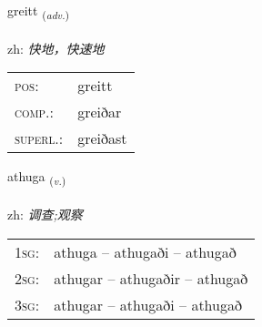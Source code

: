 \documentclass[frontgrid, backgrid]{flacards}\usepackage[]{graphicx}\usepackage[]{color}
\begin{document}
\renewcommand{\flhead}{\vskip5pt \fboxsep=0pt {\small\bfseries\footnotesize Atviksorð | 副词}}
\renewcommand{\fcfoot}{\vskip5pt \fboxsep=0pt \hspace{2pt}{\small\bfseries\footnotesize 2K}}

\renewcommand{\blhead}{\vskip5pt {\small\bfseries\footnotesize Atviksorð | 副词 }}
\renewcommand{\bcfoot}{\vskip5pt \hspace{2pt}{\small\bfseries\footnotesize 2K}}


{greitt \small{\textsubscript{(\textit{adv.})}} \\[1ex] %
\textphonetic{[kreiht]} \\
zh: \emph{快地，快速地} \\  [2ex]
\renewcommand*{\arraystretch}{0.8}
\begin{tabular}{ll}
\textsc{pos}: & greitt \\ 
\textsc{comp.}: & greiðar \\ 
\textsc{superl.}: & greiðast \\
\end{tabular}
}

\renewcommand{\flhead}{\vskip5pt \fboxsep=0pt {\small\bfseries\footnotesize Sagnorð | 动词}}
\renewcommand{\fcfoot}{\vskip5pt \fboxsep=0pt \hspace{2pt}{\small\bfseries\footnotesize 2K}}

\renewcommand{\blhead}{\vskip5pt {\small\bfseries\footnotesize Sagnorð | 动词 }}
\renewcommand{\bcfoot}{\vskip5pt \hspace{2pt}{\small\bfseries\footnotesize 2K}}


{athuga \small{\textsubscript{(\textit{v.})}} \\[1ex] %
\textphonetic{[aːthʏɣa]} \\
zh: \emph{调查;观察} \\  [2ex]
\renewcommand*{\arraystretch}{0.8}
\begin{tabular}{p{1cm}l}
\textsc{1sg}: & athuga -- athugaði -- athugað \\ 
\textsc{2sg}: & athugar -- athugaðir -- athugað \\ 
\textsc{3sg}: & athugar -- athugaði -- athugað \\ 
\end{tabular}
}
\end{document}
